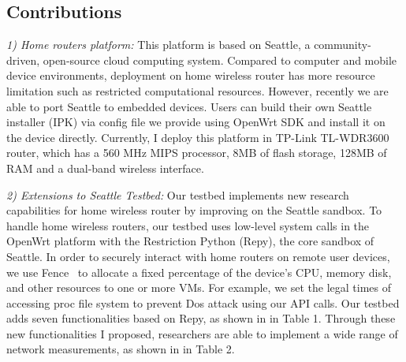 \documentclass[conference]{IEEEtran}   	%
\begin{document}
\subsection{Contributions}
\textit{1) Home routers platform:} This platform is based on Seattle\cite{zhuang2013experience}, a community-driven, open-source cloud computing system. Compared to computer and mobile device environments, deployment on home wireless router has more resource limitation such as restricted computational resources. However, recently we are able to port Seattle to embedded devices. Users can build their own Seattle installer (IPK) via config file we provide using OpenWrt SDK and install it on the device directly. Currently, I deploy this platform in TP-Link TL-WDR3600 router, which has a 560 MHz MIPS processor, 8MB of flash storage, 128MB of RAM and a dual-band wireless interface.
\newline

\textit{2) Extensions to Seattle Testbed:}  Our testbed implements new research capabilities for home wireless router by improving on the Seattle sandbox. To handle home wireless routers, our testbed uses low-level system calls in the OpenWrt platform\cite{openwrt} with the Restriction Python (Repy)\cite{cappos2010retaining}, the core sandbox of Seattle. In order to securely interact with home routers on remote user devices, we use Fence~\cite{li2015fence} to allocate a fixed percentage of the device's CPU, memory disk, and other resources to one or more VMs. For example, we set the legal times of accessing proc file system to prevent Dos attack using our API calls. Our testbed adds seven functionalities based on Repy, as shown in in Table 1. Through these new functionalities I proposed, researchers are able to implement a wide range of network measurements, as shown in in Table 2.
\newline
\end{document}
